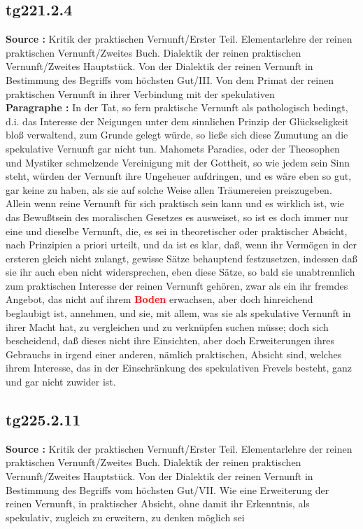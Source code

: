 \documentclass[a4paper,12pt,twoside]{book}
\newcommand{\match}[1]{\textcolor{red}{\textbf{#1}}}
\begin{document}
	\subsection*{tg221.2.4} 
	\textbf{Source : }Kritik der praktischen Vernunft/Erster Teil. Elementarlehre der reinen praktischen Vernunft/Zweites Buch. Dialektik der reinen praktischen Vernunft/Zweites Hauptstück. Von der Dialektik der reinen Vernunft in Bestimmung des Begriffs vom höchsten Gut/III. Von dem Primat der reinen praktischen Vernunft in ihrer Verbindung mit der spekulativen\\  
	
	\textbf{Paragraphe : }
	In der Tat, so fern praktische Vernunft als pathologisch bedingt, d.i. das Interesse der Neigungen unter dem sinnlichen Prinzip der Glückseligkeit bloß verwaltend, zum Grunde gelegt würde, so ließe sich diese Zumutung an die spekulative Vernunft gar nicht tun. Mahomets Paradies, oder der Theosophen und Mystiker schmelzende Vereinigung mit der Gottheit, so wie jedem sein Sinn steht, würden der Vernunft ihre Ungeheuer aufdringen, und es wäre eben so gut, gar keine zu haben, als sie auf solche Weise allen Träumereien preiszugeben. Allein wenn reine Vernunft für sich praktisch sein kann und es wirklich ist, wie das Bewußtsein des moralischen Gesetzes es ausweiset, so ist es doch immer nur eine und dieselbe Vernunft, die, es sei in theoretischer oder praktischer Absicht, nach Prinzipien a priori urteilt, und da ist es klar, daß, wenn ihr Vermögen in der ersteren gleich nicht zulangt, gewisse Sätze behauptend festzusetzen, indessen daß sie ihr auch eben nicht widersprechen, eben diese Sätze, so bald sie unabtrennlich zum praktischen Interesse der reinen Vernunft gehören, zwar als ein ihr fremdes Angebot, das nicht auf ihrem \match{Boden} erwachsen, aber doch hinreichend beglaubigt ist, annehmen, und sie, mit allem, was sie als spekulative Vernunft in ihrer Macht hat, zu vergleichen und zu verknüpfen suchen müsse; doch sich bescheidend, daß dieses nicht ihre Einsichten, aber doch Erweiterungen ihres Gebrauchs in irgend einer anderen, nämlich praktischen, Absicht sind, welches ihrem Interesse, das in der Einschränkung des spekulativen Frevels besteht, ganz und gar nicht zuwider ist. 
	
	\subsection*{tg225.2.11} 
	\textbf{Source : }Kritik der praktischen Vernunft/Erster Teil. Elementarlehre der reinen praktischen Vernunft/Zweites Buch. Dialektik der reinen praktischen Vernunft/Zweites Hauptstück. Von der Dialektik der reinen Vernunft in Bestimmung des Begriffs vom höchsten Gut/VII. Wie eine Erweiterung der reinen Vernunft, in praktischer Absicht, ohne damit ihr Erkenntnis, als spekulativ, zugleich zu erweitern, zu denken möglich sei\\  
	
\end{document}
